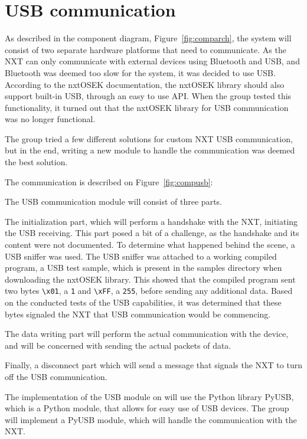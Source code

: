 \section{USB communication}
\label{sec:usbdes}
As described in the component diagram, Figure~\ref{fig:comparch}, the system will consist of two separate hardware platforms that need to communicate.
As the NXT can only communicate with external devices using Bluetooth and USB, and Bluetooth was deemed too slow for the system, it was decided to use USB.
According to the nxtOSEK documentation, the nxtOSEK library should also support built-in USB, through an easy to use API\cite{ecrobotUSB}.
When the group tested this functionality, it turned out that the nxtOSEK library for USB communication was no longer functional.

The group tried a few different solutions for custom NXT USB communication, but in the end, writing a new module to handle the communication was deemed the best solution.

The communication is described on Figure~\ref{fig:compusb}:

The USB communication module will consist of three parts.

The initialization part, which will perform a handshake with the NXT, initiating the USB receiving.
This part posed a bit of a challenge, as the handshake and its content were not documented.
To determine what happened behind the scene, a USB sniffer was used.
The USB sniffer was attached to a working compiled program, a USB test sample, which is present in the samples directory when downloading the nxtOSEK library\cite{ecrobotUSB}.
This showed that the compiled program sent two bytes \texttt{\textbackslash{}x01}, a \texttt{1} and \texttt{\textbackslash{}xFF}, a \texttt{255}, before sending any additional data.%
Based on the conducted tests of the USB capabilities, it was determined that these bytes signaled the NXT that USB communication would be commencing.

The data writing part will perform the actual communication with the device, and will be concerned with sending the actual packets of data.

Finally, a disconnect part which will send a message that signals the NXT to turn off the USB communication.

The implementation of the USB module on will use the Python library PyUSB, which is a Python module, that allows for easy use of USB devices\cite{PyUSB}.
The group will implement a PyUSB module, which will handle the communication with the NXT.
